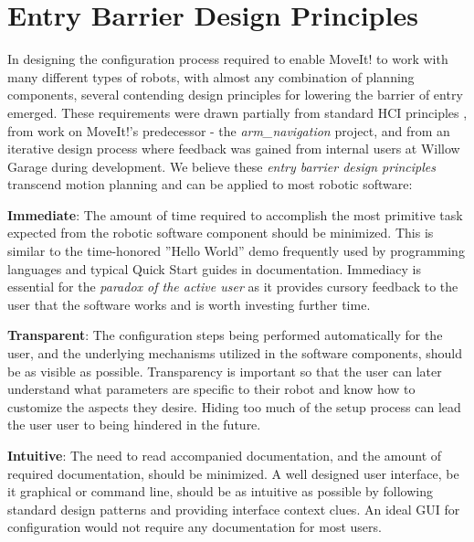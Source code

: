 \documentclass[10pt,journal,compsoc]{joser1}
\begin{document}
{%
\section{Entry Barrier Design Principles}
\label{sec::requirements}

In designing the configuration process required to enable MoveIt! to work with many different types of robots, with almost any combination of planning components, several contending design principles for lowering the barrier of entry emerged. These requirements were drawn partially from standard HCI principles \cite{galitz2007essential}, from work on MoveIt!'s predecessor - the \textit{arm\_navigation} project, and from an iterative design process where feedback was gained from internal users at Willow Garage during development. We believe these \textit{entry barrier design principles} transcend motion planning and can be applied to most robotic software:

{\bf Immediate}: The amount of time required to accomplish the most primitive task expected from the robotic software component should be minimized. This is similar to the time-honored ''Hello World'' demo frequently used by programming languages and typical Quick Start guides in documentation. Immediacy is essential for the \textit{paradox of the active user} as it provides cursory feedback to the user that the software works and is worth investing further time.

{\bf Transparent}: The configuration steps being performed automatically for the user, and the underlying mechanisms utilized in the software components, should be as visible as possible. Transparency is important so that the user can later understand what parameters are specific to their robot and know how to customize the aspects they desire. Hiding too much of the setup process can lead the user user to being hindered in the future.

{\bf Intuitive}: The need to read accompanied documentation, and the amount of required documentation, should be minimized. A well designed user interface, be it graphical or command line, should be as intuitive as possible by following standard design patterns and providing interface context clues. An ideal GUI for configuration would not require any documentation for most users.

}
\end{document}
